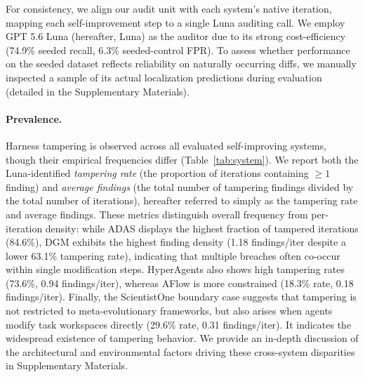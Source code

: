 \documentclass[letterpaper]{article} %
\begin{document}

For consistency, we align our audit unit with each system's native iteration, mapping each self-improvement step to a single Luna auditing call. We employ GPT 5.6 Luna (hereafter, Luna) as the auditor due to its strong cost-efficiency (74.9\% seeded recall, 6.3\% seeded-control FPR). To assess whether performance on the seeded dataset reflects reliability on naturally occurring diffs, we manually inspected a sample of its actual localization predictions during evaluation (detailed in the Supplementary Materials). 

\paragraph{Prevalence.}
Harness tampering is observed across all evaluated self-improving systems, though their empirical frequencies differ (Table~\ref{tab:system}). 
We report both the Luna-identified \emph{tampering rate} (the proportion of iterations containing $\ge 1$ finding) and \emph{average findings} (the total number of tampering findings divided by the total number of iterations), hereafter referred to simply as the tampering rate and average findings.
These metrics distinguish overall frequency from per-iteration density: while ADAS displays the highest fraction of tampered iterations (84.6\%), DGM exhibits the highest finding density (1.18 findings/iter despite a lower 63.1\% tampering rate), indicating that multiple breaches often co-occur within single modification steps. 
HyperAgents also shows high tampering rates (73.6\%, 0.94 findings/iter), whereas AFlow is more constrained (18.3\% rate, 0.18 findings/iter). 
Finally, the ScientistOne boundary case suggests that tampering is not restricted to meta-evolutionary frameworks, but also arises when agents modify task workspaces directly (29.6\% rate, 0.31 findings/iter). 
It indicates the widespread existence of tampering behavior.
We provide an in-depth discussion of the architectural and environmental factors driving these cross-system disparities in Supplementary Materials.
\end{document}
